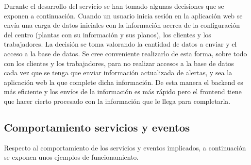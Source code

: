 Durante el desarrollo del servicio se han tomado algunas decisiones que se exponen a continuación.
Cuando un usuario inicia sesión en la aplicación web se envía una carga de datos iniciales con la información acerca de la configuración del centro (plantas con su información y sus planos), los clientes y los trabajadores. La decisión se toma valorando la cantidad de datos a enviar y el acceso a la base de datos. Se cree conveniente realizarlo de esta forma, sobre todo con los clientes y los trabajadores, para no realizar accesos a la base de datos cada vez que se tenga que enviar información actualizada de alertas, y sea la aplicación web la que complete dicha información. De esta manera el backend es más eficiente y los envíos de la información es más rápido pero el frontend tiene que hacer cierto procesado con la información que le llega para completarla.





\subsection{Comportamiento servicios y eventos}
\label{subsection-comportamiento}
Respecto al comportamiento de los servicios y eventos implicados, a continuación se exponen unos ejemplos de funcionamiento.\\


